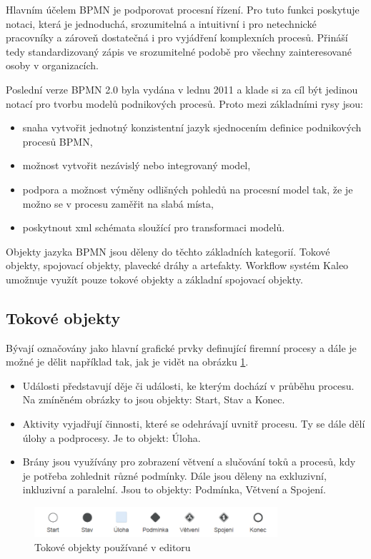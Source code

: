 \documentclass{fithesis}
\begin{document}
Hlavním účelem BPMN je podporovat procesní řízení. Pro tuto funkci poskytuje notaci, která je jednoduchá, srozumitelná a intuitivní i pro netechnické pracovníky a zároveň dostatečná i pro vyjádření komplexních procesů. Přináší tedy standardizovaný zápis ve srozumitelné podobě pro všechny zainteresované osoby v organizacích.

Poslední verze BPMN 2.0 byla vydána v lednu 2011 a klade si za cíl být jedinou notací pro tvorbu modelů podnikových procesů. Proto mezi základními rysy jsou:
\begin{itemize}
\item snaha vytvořit jednotný konzistentní jazyk sjednocením definice podnikových procesů BPMN,
\item možnost vytvořit nezávislý nebo integrovaný model,
\item podpora a možnost výměny odlišných pohledů na procesní model tak, že je možno se v procesu zaměřit na slabá místa,
\item poskytnout xml schémata sloužící pro transformaci modelů.
\end{itemize}

Objekty jazyka BPMN jsou děleny do těchto základních kategorií. Tokové objekty, spojovací objekty, plavecké dráhy a artefakty. \cite{bpmn} Workflow systém Kaleo umožnuje využít pouze tokové objekty a základní spojovací objekty.

\subsection{Tokové objekty}
Bývají označovány jako hlavní grafické prvky definující firemní procesy a dále je možné je dělit například tak, jak je vidět na obrázku \ref{fig:tokove_objekty}.

\begin{itemize}
\item Události představují děje či události, ke kterým dochází v průběhu procesu. Na zmíněném obrázky to jsou objekty: Start, Stav a Konec.
\item Aktivity vyjadřují činnosti, které se odehrávají uvnitř procesu. Ty se dále dělí úlohy a podprocesy. Je to objekt: Úloha.
\item Brány jsou využívány pro zobrazení větvení a slučování toků a procesů, kdy je potřeba zohlednit různé podmínky. Dále jsou děleny na exkluzivní, inkluzivní a paralelní. Jsou to objekty: Podmínka, Větvení a Spojení.
\end{itemize}

\begin{figure}[htp]
\centering
\includegraphics[width=340px]{images/tokove_objekty.png}
\caption{Tokové objekty používané v editoru}
\label{fig:tokove_objekty}
\end{figure}
\end{document}
